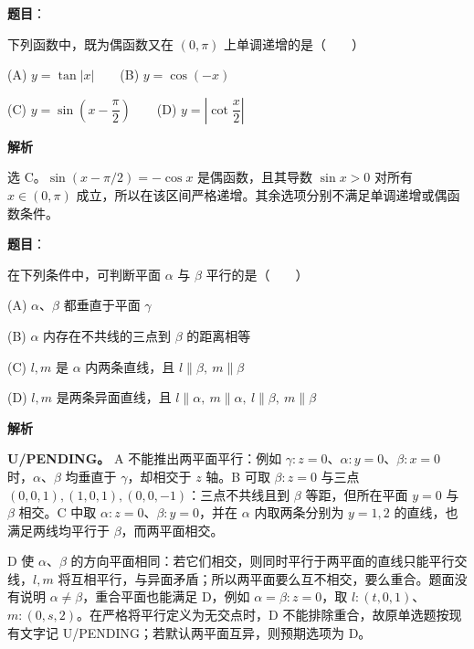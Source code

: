 \begin{answer}

\textbf{题目}：

下列函数中，既为偶函数又在 \((0,\pi)\) 上单调递增的是\mbox{（　　）}

    (A) \(y=\tan|x|\)　　(B) \(y=\cos(-x)\)

    (C) \(y=\sin\left(x-\dfrac{\pi}{2}\right)\)　　(D) \(y=\left|\cot\dfrac{x}{2}\right|\)

\textbf{解析}

选 C。\(\sin(x-\pi/2)=-\cos x\) 是偶函数，且其导数 \(\sin x>0\) 对所有 \(x\in(0,\pi)\) 成立，所以在该区间严格递增。其余选项分别不满足单调递增或偶函数条件。


\end{answer}
\begin{answer}

\textbf{题目}：

在下列条件中，可判断平面 \(\alpha\) 与 \(\beta\) 平行的是\mbox{（　　）}

    (A) \(\alpha\text{、}\beta\) 都垂直于平面 \(\gamma\)

    (B) \(\alpha\) 内存在不共线的三点到 \(\beta\) 的距离相等

    (C) \(l,m\) 是 \(\alpha\) 内两条直线，且 \(l\parallel\beta,\ m\parallel\beta\)

    (D) \(l,m\) 是两条异面直线，且 \(l\parallel\alpha,\ m\parallel\alpha,\ l\parallel\beta,\ m\parallel\beta\)

\textbf{解析}

\textbf{U/PENDING。} A 不能推出两平面平行：例如 \(\gamma:z=0\)、\(\alpha:y=0\)、\(\beta:x=0\) 时，\(\alpha\)、\(\beta\) 均垂直于 \(\gamma\)，却相交于 \(z\) 轴。B 可取 \(\beta:z=0\) 与三点 \((0,0,1),(1,0,1),(0,0,-1)\)：三点不共线且到 \(\beta\) 等距，但所在平面 \(y=0\) 与 \(\beta\) 相交。C 中取 \(\alpha:z=0\)、\(\beta:y=0\)，并在 \(\alpha\) 内取两条分别为 \(y=1,2\) 的直线，也满足两线均平行于 \(\beta\)，而两平面相交。

D 使 \(\alpha\)、\(\beta\) 的方向平面相同：若它们相交，则同时平行于两平面的直线只能平行交线，\(l,m\) 将互相平行，与异面矛盾；所以两平面要么互不相交，要么重合。题面没有说明 \(\alpha\ne\beta\)，重合平面也能满足 D，例如 \(\alpha=\beta:z=0\)，取 \(l:(t,0,1)\)、\(m:(0,s,2)\)。在严格将平行定义为无交点时，D 不能排除重合，故原单选题按现有文字记 U/PENDING；若默认两平面互异，则预期选项为 D。


\end{answer}
